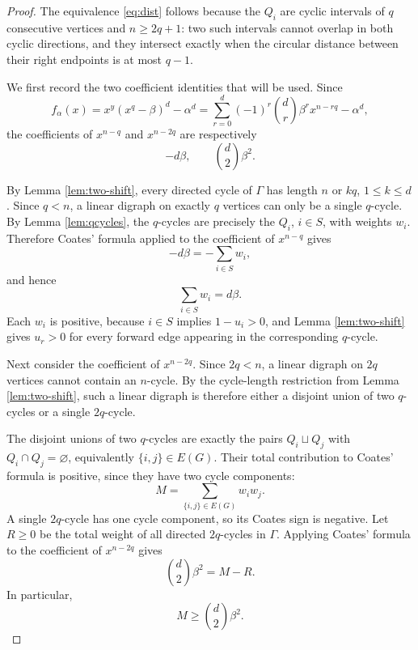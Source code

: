 \documentclass[11pt]{article}
\numberwithin{equation}{section}
\begin{document}
\begin{proof}
The equivalence \eqref{eq:dist} follows because the $Q_i$ are cyclic
intervals of $q$ consecutive vertices and $n\ge2q+1$: two such intervals
cannot overlap in both cyclic directions, and they intersect exactly when the
circular distance between their right endpoints is at most $q-1$.

We first record the two coefficient identities that will be used. Since
\[
        f_\alpha(x)=x^y(x^q-\beta)^d-\alpha^d
        =\sum_{r=0}^d (-1)^r\binom dr\beta^r x^{n-rq}-\alpha^d,
\]
the coefficients of $x^{n-q}$ and $x^{n-2q}$ are respectively
\[
        -d\beta,
        \qquad
        \binom d2\beta^2.
\]

By Lemma \ref{lem:two-shift}, every directed cycle of $\Gamma$ has length
$n$ or $kq$, $1\le k\le d$. Since $q<n$, a linear digraph on exactly $q$
vertices can only be a single $q$-cycle. By Lemma \ref{lem:qcycles}, the
$q$-cycles are precisely the $Q_i$, $i\in S$, with weights $w_i$. Therefore
Coates' formula applied to the coefficient of $x^{n-q}$ gives
\[
        -d\beta=-\sum_{i\in S}w_i,
\]
and hence
\begin{equation}
        \sum_{i\in S}w_i=d\beta. \label{eq:totalweight}
\end{equation}
Each $w_i$ is positive, because $i\in S$ implies $1-u_i>0$, and Lemma
\ref{lem:two-shift} gives $u_r>0$ for every forward edge appearing in the
corresponding $q$-cycle.

Next consider the coefficient of $x^{n-2q}$. Since $2q<n$, a linear digraph
on $2q$ vertices cannot contain an $n$-cycle. By the cycle-length restriction
from Lemma \ref{lem:two-shift}, such a linear digraph is therefore either a
disjoint union of two $q$-cycles or a single $2q$-cycle.

The disjoint unions of two $q$-cycles are exactly the pairs
$Q_i\sqcup Q_j$ with $Q_i\cap Q_j=\varnothing$, equivalently
$\{i,j\}\in E(G)$. Their total contribution to Coates' formula is positive,
since they have two cycle components:
\[
        M=\sum_{\{i,j\}\in E(G)}w_iw_j.
\]
A single $2q$-cycle has one cycle component, so its Coates sign is negative.
Let $R\ge0$ be the total weight of all directed $2q$-cycles in $\Gamma$.
Applying Coates' formula to the coefficient of $x^{n-2q}$ gives
\begin{equation}
        \binom d2\beta^2=M-R. \label{eq:coates2q}
\end{equation}
In particular,
\begin{equation}
        M\ge \binom d2\beta^2. \label{eq:lowerM}
\end{equation}


\end{proof}
\end{document}
